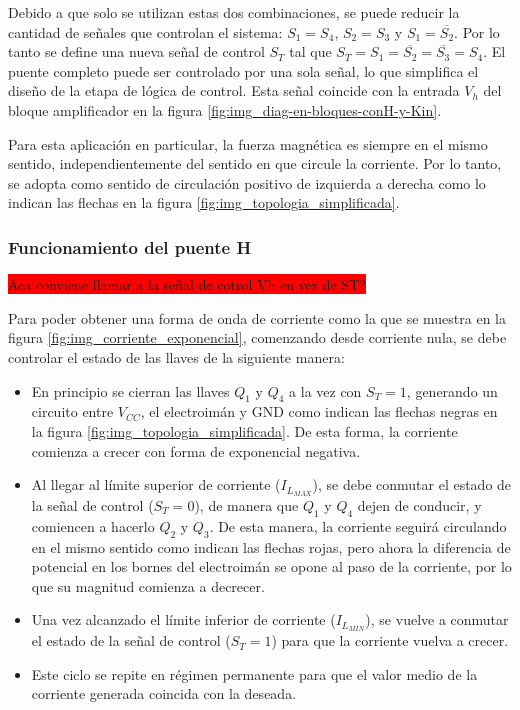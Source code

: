 Debido a que solo se utilizan estas dos combinaciones, se puede reducir la cantidad de señales que controlan el sistema: $S_1=S_4$, $S_2=S_3$ y $S_1=\overline{S_2}$. Por lo tanto se define una nueva señal de control $S_T$ tal que $S_T=S_1=\overline{S_2}=\overline{S_3}=S_4$. El puente completo puede ser controlado por una sola señal, lo que simplifica el diseño de la etapa de lógica de control. Esta señal coincide con la entrada $V_h$ del bloque amplificador en la figura \ref{fig:img_diag-en-bloques-conH-y-Kin}.

Para esta aplicación en particular, la fuerza magnética es siempre en el mismo sentido, independientemente del sentido en que circule la corriente. Por lo tanto, se adopta como sentido de circulación positivo de izquierda a derecha como lo indican las flechas en la figura \ref{fig:img_topologia_simplificada}. 



\subsubsection{Funcionamiento del puente H}
\colorbox{red}{Aca conviene llamar a la señal de cotrol Vh en vez de ST?}

Para poder obtener una forma de onda de corriente como la que se muestra en la figura \ref{fig:img_corriente_exponencial}, comenzando desde corriente nula, se debe controlar el estado de las llaves de la siguiente manera:


\begin{itemize}
	\item En principio se cierran las llaves $Q_1$ y $Q_4$ a la vez con $S_T=1$, generando un circuito entre $V_{CC}$, el electroimán y GND como indican las flechas negras en la figura \ref{fig:img_topologia_simplificada}. De esta forma, la corriente comienza a crecer con forma de exponencial negativa.
	\item Al llegar al límite superior de corriente ($I_{L_{MAX}}$), se debe conmutar el estado de la señal de control ($S_T=0$), de manera que $Q_1$ y $Q_4$ dejen de conducir, y comiencen a hacerlo $Q_2$ y $Q_3$. De esta manera, la corriente seguirá circulando en el mismo sentido como indican las flechas rojas, pero ahora la diferencia de potencial en los bornes del electroimán se opone al paso de la corriente, por lo que su magnitud comienza a decrecer.
	\item Una vez alcanzado el límite inferior de corriente ($I_{L_{MIN}}$), se vuelve a conmutar el estado de la señal de control ($S_T=1$) para que la corriente vuelva a crecer.
	\item Este ciclo se repite en régimen permanente para que el valor medio de la corriente generada coincida con la deseada. 
\end{itemize}


